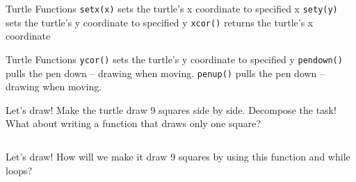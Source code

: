         \begin{frame}{Turtle Functions}
         \LARGE
            \texttt{setx(x)} \newline
            sets the turtle's x coordinate to specified x\newline\newline
            \pause
            \texttt{sety(y)} \newline
            sets the turtle's y coordinate to specified y\newline\newline
            \pause
            \texttt{xcor()}   \newline   
            returns the turtle's x coordinate\newline\newline
            \bigskip
            \end{frame}
        \begin{frame}{Turtle Functions}
        \LARGE
        \texttt{ycor()} \newline
            sets the turtle's y coordinate to specified y\newline\newline
            \pause
            \texttt{pendown()} \newline
            pulls the pen down – drawing when moving.\newline\newline
            \pause
            \texttt{penup()}\newline
            pulls the pen down – drawing when moving.\newline\newline
            
        \end{frame}
    \begin{frame}{Let's draw!}
            \large
            Make the turtle draw 9 squares side by side.
            \pause
             \newline Decompose the task! What about writing a function that draws only one square?
            \pause
            \inputminted[frame=single,framesep=2pt, lastline=10]{python3}{code-examples/draw.py}
        \end{frame}

        \begin{frame}{Let's draw!}
            \large
            How will we make it draw 9 squares by using this function and while loops?
            \pause
            \inputminted[frame=single,framesep=2pt, firstline=12]{python3}{code-examples/draw.py}
        \end{frame}
       
   


